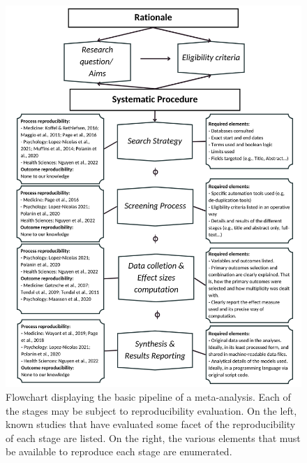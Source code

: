 \documentclass[
  ,jou, a4paper,floatsintext]{apa6}
\begin{document}
\begin{figure}
\begin{center}
\includegraphics[width=\textwidth, height=\textheight]{results/Figure 1.png}

\caption{Flowchart displaying the basic pipeline of a meta-analysis. Each of the stages may be subject to reproducibility evaluation. On the left, known studies that have evaluated some facet of the reproducibility of each stage are listed. On the right, the various elements that must be available to reproduce each stage are enumerated.
}

\label{fig:figs1}
\end{center}
\end{figure}
\end{document}
